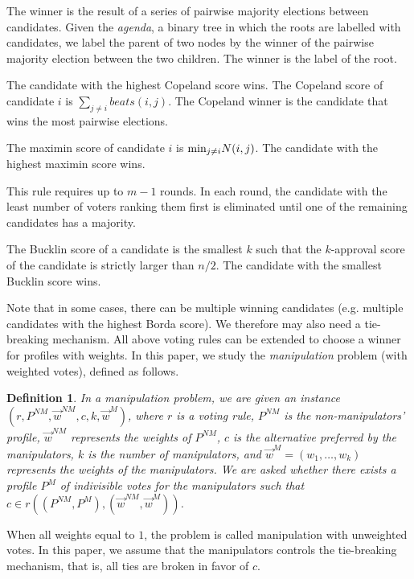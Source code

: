 \documentclass{ecai2012}
\newcommand{\mymin}{\mbox{\rm min}}
\newcommand\lirong[1]{}
\newtheorem{dfn}{Definition}
\begin{document}
 The winner is the result of a series of pairwise
majority elections between candidates.
Given the \emph{agenda}, a binary tree
in which the roots are labelled with candidates, we label
the parent of two nodes by
the winner of the pairwise majority election between
the two children. The winner is the label of the
root.

 The candidate
with the highest Copeland score wins. The
Copeland score of candidate $i$
is $\sum_{j \neq i} beats(i,j)$.\lirong{I changed it to a more standard definition.}
The Copeland winner is the candidate that wins the
most pairwise elections.

 The maximin score of candidate
$i$ is $\mymin_{j \neq i} N(i,j)$. The candidate with the
highest maximin score wins.

 This rule
requires up to $m-1$ rounds. In each round,
the candidate with the least number of voters ranking
them first is eliminated until one of the remaining candidates
has a majority.


 The Bucklin score of a candidate is the smallest $k$ such that the $k$-approval  score of the candidate is strictly larger than $n/2$. The candidate with the smallest Bucklin score wins.\lirong{Definition is changed.}


Note that in some cases, there can be
multiple winning candidates (e.g. multiple
candidates with the highest
Borda score). We therefore may
also need a tie-breaking mechanism.
All above voting rules can be extended to choose a winner for profiles with weights. In this paper, we study the {\em manipulation} problem (with weighted votes), defined as follows.
\begin{dfn}\lirong{I added a formal definition of the manipulation problem because some reviewer must ask for it...}
In a \emph{manipulation} problem, we are given an instance $(r,P^{NM},\vec
w^{NM},c,k,\vec w^M)$, where $r$ is a voting rule, $P^{NM}$ is the
non-manipulators' profile, $\vec w^{NM}$ represents the weights of
$P^{NM}$, $c$ is the alternative preferred by the manipulators, $k$
is the number of manipulators, and $\vec w^M=(w_1,\ldots,w_k)$
represents the weights of the manipulators. We are asked whether
there exists a profile $P^{M}$ of indivisible votes for the
manipulators such that $ c\in r((P^{NM},P^{M}), (\vec w^{NM},\vec
w^M))$.
\end{dfn}
When all weights equal to $1$, the problem is called manipulation with unweighted votes. In this paper, we assume that the manipulators controls the tie-breaking mechanism, that is, all ties are broken in favor of $c$.
\end{document}
